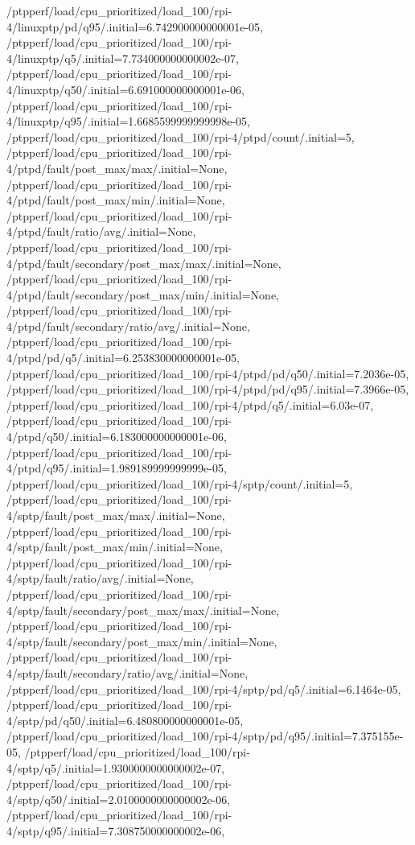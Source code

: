 {    /ptpperf/load/cpu_prioritized/load_100/rpi-4/linuxptp/pd/q95/.initial=6.742900000000001e-05,
    /ptpperf/load/cpu_prioritized/load_100/rpi-4/linuxptp/q5/.initial=7.734000000000002e-07,
    /ptpperf/load/cpu_prioritized/load_100/rpi-4/linuxptp/q50/.initial=6.691000000000001e-06,
    /ptpperf/load/cpu_prioritized/load_100/rpi-4/linuxptp/q95/.initial=1.6685599999999998e-05,
    /ptpperf/load/cpu_prioritized/load_100/rpi-4/ptpd/count/.initial=5,
    /ptpperf/load/cpu_prioritized/load_100/rpi-4/ptpd/fault/post_max/max/.initial=None,
    /ptpperf/load/cpu_prioritized/load_100/rpi-4/ptpd/fault/post_max/min/.initial=None,
    /ptpperf/load/cpu_prioritized/load_100/rpi-4/ptpd/fault/ratio/avg/.initial=None,
    /ptpperf/load/cpu_prioritized/load_100/rpi-4/ptpd/fault/secondary/post_max/max/.initial=None,
    /ptpperf/load/cpu_prioritized/load_100/rpi-4/ptpd/fault/secondary/post_max/min/.initial=None,
    /ptpperf/load/cpu_prioritized/load_100/rpi-4/ptpd/fault/secondary/ratio/avg/.initial=None,
    /ptpperf/load/cpu_prioritized/load_100/rpi-4/ptpd/pd/q5/.initial=6.253830000000001e-05,
    /ptpperf/load/cpu_prioritized/load_100/rpi-4/ptpd/pd/q50/.initial=7.2036e-05,
    /ptpperf/load/cpu_prioritized/load_100/rpi-4/ptpd/pd/q95/.initial=7.3966e-05,
    /ptpperf/load/cpu_prioritized/load_100/rpi-4/ptpd/q5/.initial=6.03e-07,
    /ptpperf/load/cpu_prioritized/load_100/rpi-4/ptpd/q50/.initial=6.183000000000001e-06,
    /ptpperf/load/cpu_prioritized/load_100/rpi-4/ptpd/q95/.initial=1.989189999999999e-05,
    /ptpperf/load/cpu_prioritized/load_100/rpi-4/sptp/count/.initial=5,
    /ptpperf/load/cpu_prioritized/load_100/rpi-4/sptp/fault/post_max/max/.initial=None,
    /ptpperf/load/cpu_prioritized/load_100/rpi-4/sptp/fault/post_max/min/.initial=None,
    /ptpperf/load/cpu_prioritized/load_100/rpi-4/sptp/fault/ratio/avg/.initial=None,
    /ptpperf/load/cpu_prioritized/load_100/rpi-4/sptp/fault/secondary/post_max/max/.initial=None,
    /ptpperf/load/cpu_prioritized/load_100/rpi-4/sptp/fault/secondary/post_max/min/.initial=None,
    /ptpperf/load/cpu_prioritized/load_100/rpi-4/sptp/fault/secondary/ratio/avg/.initial=None,
    /ptpperf/load/cpu_prioritized/load_100/rpi-4/sptp/pd/q5/.initial=6.1464e-05,
    /ptpperf/load/cpu_prioritized/load_100/rpi-4/sptp/pd/q50/.initial=6.480800000000001e-05,
    /ptpperf/load/cpu_prioritized/load_100/rpi-4/sptp/pd/q95/.initial=7.375155e-05,
    /ptpperf/load/cpu_prioritized/load_100/rpi-4/sptp/q5/.initial=1.9300000000000002e-07,
    /ptpperf/load/cpu_prioritized/load_100/rpi-4/sptp/q50/.initial=2.0100000000000002e-06,
    /ptpperf/load/cpu_prioritized/load_100/rpi-4/sptp/q95/.initial=7.308750000000002e-06,
}
